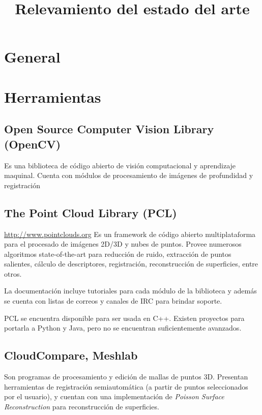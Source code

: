 \documentclass{pfc}
\title{Relevamiento del estado del arte}
\begin{document}
	\maketitle
	\section{General}

	\section{Herramientas}
		\subsection{Open Source Computer Vision Library (OpenCV)}
			Es una biblioteca de código abierto de
			visión computacional y aprendizaje maquinal.
			Cuenta con módulos de
			procesamiento de imágenes de profundidad
			y registración


		\subsection{The Point Cloud Library (PCL)}
			\url{http://www.pointclouds.org}
			Es un framework de código abierto multiplataforma para el procesado de imágenes 2D/3D y nubes de puntos.
			Provee numerosos algoritmos state-of-the-art %
			para reducción de ruido, extracción de puntos salientes,
			cálculo de descriptores, registración,
			reconstrucción de superficies, entre otros.

			La documentación incluye tutoriales para cada módulo de la biblioteca
			y además se cuenta con listas de correos
			y canales de IRC para brindar soporte.

			PCL se encuentra disponible para ser usada en C++.
			Existen proyectos para portarla a Python y Java,
			pero no se encuentran suficientemente avanzados.

		\subsection{CloudCompare, Meshlab}
			Son programas de procesamiento y edición de mallas de puntos 3D.
			Presentan herramientas de registración semiautomática (a partir de
			puntos seleccionados por el usuario), y cuentan con una
			implementación de \emph{Poisson Surface Reconstruction}
			para reconstrucción de superficies.
\end{document}
